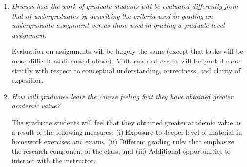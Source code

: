 \documentclass[11pt,onecolumn]{article}
\begin{document}
\begin{enumerate}
\item \emph{Discuss how the work of graduate students will be evaluated differently from that of undergraduates by describing the criteria used in grading an undergraduate assignment versus those used in grading a graduate level assignment.}

  Evaluation on assignments will be largely the same (except that tasks will be more difficult as discussed above). Midterms and exams will be graded more strictly with respect to conceptual understanding, correctness, and clarity of exposition. 

\item \emph{How will graduates leave the course feeling that they have obtained greater academic value?}

The graduate students will feel that they obtained greater academic value as a result of the following measures: (i) Exposure to deeper level of material in homework exercises and exams, (ii) Different grading rules that emphasize the research component of the class, and (iii) Additional opportunities to interact with the instructor.
  
\end{enumerate}
\end{document}
